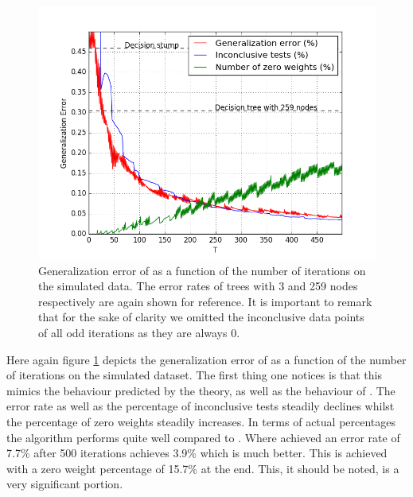 \begin{figure}[!ht]
  \centering
      \includegraphics[width=\graphWidth]{generated/NHGD.png}
  \caption{Generalization error of \NHB as a function of the number of iterations on the simulated data. The error rates of trees with 3 and 259 nodes respectively are again shown for reference. It is important to remark that for the sake of clarity we omitted the inconclusive data points of all odd iterations as they are always 0.}
      \label{fig:NHBGD}
\end{figure}
 \FloatBarrier
 \par Here again figure \ref{fig:NHBGD} depicts the generalization error of \NHB as a function of the number of iterations on the simulated dataset. The first thing one notices is that this mimics the behaviour predicted by the theory, as well as the behaviour of \adaB. The error rate as well as the percentage of inconclusive tests steadily declines whilst the percentage of zero weights steadily increases. In terms of actual percentages the algorithm performs quite well compared to \adaB. Where \adaB achieved an error rate of 7.7\% after 500 iterations \NHB achieves 3.9\% which is much better. This is achieved with a zero weight percentage of 15.7\% at the end. This, it should be noted, is a very significant portion. 
